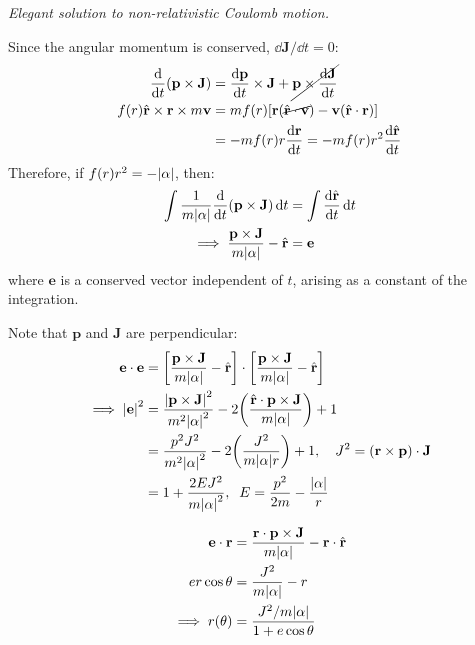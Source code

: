 \documentclass{report}
\begin{document}
\begin{subquests}
	\item \emph{Elegant solution to non-relativistic Coulomb motion.}
	\begin{subquests}
		\item
		Since the angular momentum is conserved, $\dd{\mathbf J}/\dd{t} = 0$:
		\begin{align*}
			\dv{t}\pqty{\mathbf p \times \mathbf J} & = \dv{\mathbf p}{t}\times \mathbf J + \cancel{\mathbf p \times \dv{\mathbf J}{t}} \\
			f(r)\hat{\mathbf r} \times \mathbf r \times m\mathbf v & = mf(r)\bqty{\mathbf r\pqty{\cancel{\hat{\mathbf r}\cdot \mathbf v}} - \mathbf v\pqty{\hat{\mathbf r}\cdot \mathbf r}} \\
			& = -mf(r)r\dv{\mathbf r}{t} = -mf(r)r^2 \dv{\hat{\mathbf r}}{t}  
		\end{align*}
		Therefore, if $f(r)r^2 = -\abs{\alpha}$, then:
		\begin{align*}
			\int \frac{1}{m\abs{\alpha}}\dv{t}\pqty{\mathbf p \times \mathbf J} \dd{t} & = \int \dv{\hat{\mathbf r}}{t} \dd{t} \\
			\implies \frac{\mathbf p \times \mathbf J}{m\abs{\alpha}} - \hat{\mathbf r} & = \mathbf e
		\end{align*}
		where $\mathbf e$ is a conserved vector independent of $t$, arising as a constant of the integration.
		
		\item Note that $\mathbf p$ and $\mathbf J$ are perpendicular:
		\begin{align*}
			\mathbf e \cdot \mathbf e & = \bqty{\frac{\mathbf p \times \mathbf J}{m\abs{\alpha}} - \hat{\mathbf r}}\cdot \bqty{\frac{\mathbf p \times \mathbf J}{m\abs{\alpha}} - \hat{\mathbf r}} \\
			\implies \abs{\mathbf e}^2 & = \frac{\abs{\mathbf p \times \mathbf J}^2}{m^2\abs{\alpha}^2} - 2\pqty{\frac{\hat{\mathbf r} \cdot \mathbf p \times \mathbf J}{m\abs{\alpha}}} + 1 \\
			& = \frac{p^2 J^2}{m^2\abs{\alpha}^2}- 2\pqty{\frac{J^2}{m\abs{\alpha}r}} + 1, \quad J^2 = \pqty{\mathbf r \times \mathbf p} \cdot \mathbf J\\
			& = 1 + \frac{2EJ^2}{m\abs{\alpha}^2}, \;\; E = \frac{p^2}{2m} - \frac{\abs{\alpha}}{r}
		\end{align*}
		
		\item
		\begin{align*}
			\mathbf e \cdot \mathbf r & = \frac{\mathbf r \cdot \mathbf p \times \mathbf J}{m\abs{\alpha}} - \mathbf r \cdot \hat{\mathbf r} \\
			er\cos\theta & = \frac{J^2}{m\abs{\alpha}} - r \\
			\implies r(\theta) & = \frac{J^2/m\abs{\alpha}}{1+ e\cos\theta}
		\end{align*}


\end{subquests}
\end{subquests}
\end{document}
